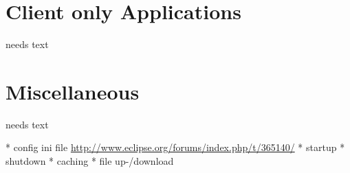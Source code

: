 \documentclass[a4paper,10pt,twoside]{book}
\begin{document}
\section{Client only Applications}
needs text
  
\section{Miscellaneous}
needs text

  * config ini file \url{http://www.eclipse.org/forums/index.php/t/365140/}
  * startup
  * shutdown
  * caching
  * file up-/download
  

\ifx\wholebook\relax\else
   
   
\end{document}
